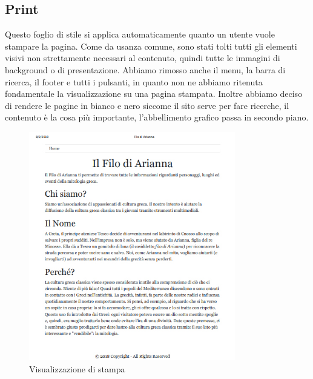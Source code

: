 \subsection{Print}
Questo foglio di stile si applica automaticamente quanto un utente vuole
stampare la pagina. Come da usanza comune, sono stati tolti tutti gli elementi visivi non strettamente necessari al contenuto, quindi tutte le immagini
di background o di presentazione. Abbiamo rimosso anche il menu, la barra di ricerca, il footer e tutti i pulsanti, in quanto non ne abbiamo ritenuta fondamentale la visualizzazione su una pagina stampata. Inoltre abbiamo deciso di rendere le pagine in bianco e nero siccome il sito serve per fare ricerche, il contenuto è la cosa più importante, l'abbellimento grafico passa in secondo piano.
\begin{figure}[H]
	\begin{center}
		\includegraphics[width=9cm]{img/print.jpg}
		\caption{Visualizzazione di stampa}
	\end{center}
\end{figure}